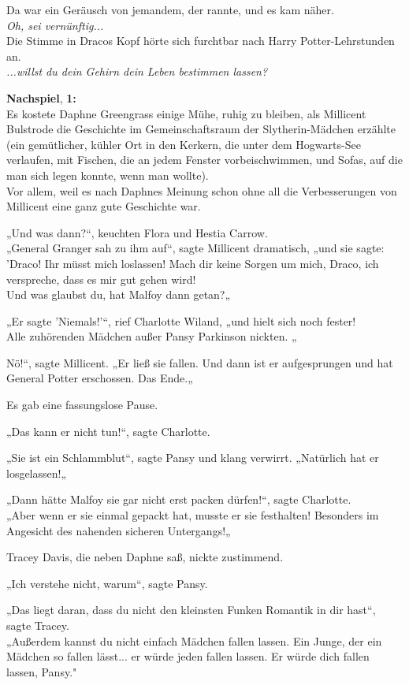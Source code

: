 {Da war ein Geräusch von jemandem, der rannte, und es kam näher.\\ \emph{\hfill\break Oh, sei vernünftig...}\\ Die Stimme in Dracos Kopf hörte sich furchtbar nach Harry Potter-Lehrstunden an.\\ \emph{...willst du dein Gehirn dein Leben bestimmen lassen?}

\textbf{Nachspiel}, \textbf{1:}\\ Es kostete Daphne Greengrass einige Mühe, ruhig zu bleiben, als Millicent Bulstrode die Geschichte im Gemeinschaftsraum der Slytherin-Mädchen erzählte (ein gemütlicher, kühler Ort in den Kerkern, die unter dem Hogwarts-See verlaufen, mit Fischen, die an jedem Fenster vorbeischwimmen, und Sofas, auf die man sich legen konnte, wenn man wollte).\\ Vor allem, weil es nach Daphnes Meinung schon ohne all die Verbesserungen von Millicent eine ganz gute Geschichte war.

„Und was dann?“, keuchten Flora und Hestia Carrow.\\ „General Granger sah zu ihm auf“, sagte Millicent dramatisch, „und sie sagte: 'Draco! Ihr müsst mich loslassen! Mach dir keine Sorgen um mich, Draco, ich verspreche, dass es mir gut gehen wird!\\ Und was glaubst du, hat Malfoy dann getan?„

„Er sagte 'Niemals!'“, rief Charlotte Wiland, „und hielt sich noch fester!\\ Alle zuhörenden Mädchen außer Pansy Parkinson nickten. „

Nö!“, sagte Millicent. „Er ließ sie fallen. Und dann ist er aufgesprungen und hat General Potter erschossen. Das Ende.„

Es gab eine fassungslose Pause.

„Das kann er nicht tun!“, sagte Charlotte.

„Sie ist ein Schlammblut“, sagte Pansy und klang verwirrt. „Natürlich hat er losgelassen!„

„Dann hätte Malfoy sie gar nicht erst packen dürfen!“, sagte Charlotte.\\ „Aber wenn er sie einmal gepackt hat, musste er sie festhalten! Besonders im Angesicht des nahenden sicheren Untergangs!„

Tracey Davis, die neben Daphne saß, nickte zustimmend.

„Ich verstehe nicht, warum“, sagte Pansy.

„Das liegt daran, dass du nicht den kleinsten Funken Romantik in dir hast“, sagte Tracey.\\ „Außerdem kannst du nicht einfach Mädchen fallen lassen. Ein Junge, der ein Mädchen so fallen lässt... er würde jeden fallen lassen. Er würde dich fallen lassen, Pansy."

}
